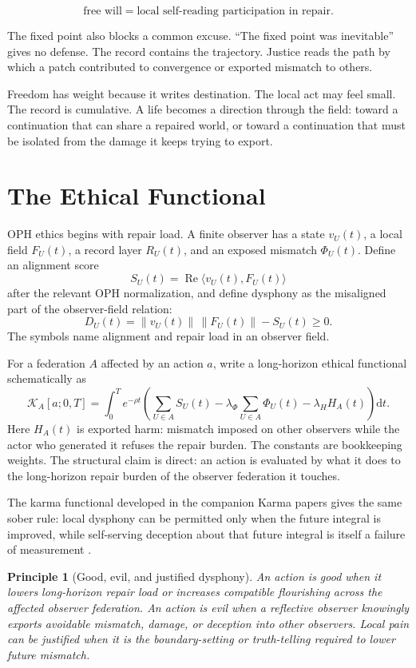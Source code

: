 \documentclass[11pt]{article}
\newtheorem{principle}[definition]{Principle}
\theoremstyle{remark}
\theoremstyle{plain}
\newcommand{\Karma}{\mathcal K}
\newcommand{\dd}{\mathrm d}
\begin{document}
\[
\boxed{
\text{free will}=\text{local self-reading participation in repair}.
}
\]

The fixed point also blocks a common excuse. ``The fixed point was inevitable'' gives no
defense. The record contains the trajectory. Justice reads the path by which a
patch contributed to convergence or exported mismatch to others.

Freedom has weight because it writes destination. The local act may
feel small. The record is cumulative. A life becomes a direction through the
field: toward a continuation that can share a repaired world, or toward a
continuation that must be isolated from the damage it keeps trying to export.

\section{The Ethical Functional}

OPH ethics begins with repair load. A finite observer has a state \(v_U(t)\), a
local field \(F_U(t)\), a record layer
\(R_U(t)\), and an exposed mismatch \(\Phi_U(t)\). Define an alignment score
\[
S_U(t)=\operatorname{Re}\langle v_U(t),F_U(t)\rangle
\]
after the relevant OPH normalization, and define dysphony as the misaligned
part of the observer-field relation:
\[
D_U(t)=\|v_U(t)\|\,\|F_U(t)\|-S_U(t)\ge 0.
\]
The symbols name alignment and repair load in an observer field.

For a federation \(A\) affected by an action \(a\), write a long-horizon ethical
functional schematically as
\[
\Karma_A[a;0,T]
=
\int_0^T e^{-\rho t}
\left(
\sum_{U\in A} S_U(t)
-\lambda_\Phi\sum_{U\in A}\Phi_U(t)
-\lambda_H H_A(t)
\right)\dd t.
\]
Here \(H_A(t)\) is exported harm: mismatch imposed on other observers while the
actor who generated it refuses the repair burden. The constants are bookkeeping
weights. The structural claim is direct: an action is evaluated by what it does
to the long-horizon repair burden of the observer federation it touches.

The karma functional developed in the companion Karma papers gives the same
sober rule: local dysphony can be permitted only when the future integral is
improved, while self-serving deception about that future integral is itself a
failure of measurement \cite{KarmaVibes,KarmaFuture}.

\begin{principle}[Good, evil, and justified dysphony]
An action is good when it lowers long-horizon repair load or increases
compatible flourishing across the affected observer federation. An action is
evil when a reflective observer knowingly exports avoidable mismatch, damage,
or deception into other observers. Local pain can be justified when it is the
boundary-setting or truth-telling required to lower future mismatch.
\end{principle}
\end{document}
